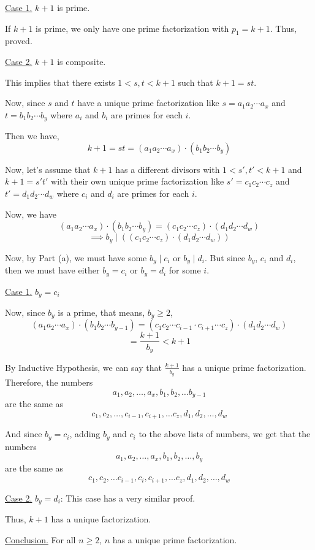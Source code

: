 \begin{enumerate}
	\underline{Case 1.} $k+1$ is prime.

	If $k+1$ is prime, we only have one prime factorization with $p_1 = k+1$. Thus, proved.

	\underline{Case 2.} $k+1$ is composite.

	This implies that there exists $1 < s,t < k+1$ such that $k+1 = st$.

	Now, since $s$ and $t$ have a unique prime factorization like $s = a_1 a_2 \cdots a_x$ and $t = b_1 b_2 \cdots b_y$ where $a_i$ and $b_i$ are primes for each $i$. 

	Then we have,
	$$k+1 = st = (a_1 a_2 \cdots a_x) \cdot (b_1 b_2 \cdots b_y)$$

	Now, let's assume that $k+1$ has a different divisors with $1 < s', t' < k+1$ and $k+1 = s't'$ with their own unique prime factorization like $s' = c_1 c_2 \cdots c_z$ and $t' = d_1 d_2 \cdots d_w$ where $c_i$ and $d_i$ are primes for each $i$.

	Now, we have
	$$(a_1 a_2 \cdots a_x) \cdot (b_1 b_2 \cdots b_y) = (c_1 c_2 \cdots c_z) \cdot (d_1 d_2 \cdots d_w)$$
	$$\implies b_y \mid ((c_1 c_2 \cdots c_z) \cdot (d_1 d_2 \cdots d_w))$$

	Now, by Part (a), we must have some $b_y \mid c_i$ or $b_y \mid d_i$. But since $b_y$, $c_i$ and $d_i$, then we must have either $b_y = c_i$ or $b_y = d_i$ for some $i$.

	\underline{Case 1.} $b_y = c_i$

	Now, since $b_y$ is a prime, that means, $b_y \geq 2$,
	$$(a_1 a_2 \cdots a_x) \cdot (b_1 b_2 \cdots b_{y-1}) = (c_1 c_2 \cdots c_{i-1} \cdot c_{i+1} \cdots c_{z}) \cdot (d_1 d_2 \cdots d_w)$$
	$$= \frac{k+1}{b_y} < k+1$$

	By Inductive Hypothesis, we can say that $\displaystyle \frac{k+1}{b_y}$ has a unique prime factorization. Therefore, the numbers
	$$a_1, a_2, \ldots, a_x, b_1, b_2, \ldots b_{y-1}$$
	are the same as 
	$$c_1, c_2, \ldots, c_{i-1}, c_{i+1}, \ldots c_z, d_1, d_2, \ldots, d_w$$

	And since $b_y = c_i$, adding $b_y$ and $c_i$ to the above lists of numbers, we get that the numbers 
	$$a_1, a_2, \ldots, a_x, b_1, b_2, \ldots, b_y$$
	are the same as 
	$$c_1, c_2, \ldots c_{i-1}, c_i, c_{i+1}, \ldots c_z, d_1, d_2, \ldots, d_w$$

	\underline{Case 2.} $b_y = d_i$: This case has a very similar proof.

	Thus, $k+1$ has a unique factorization.
	
	\underline{Conclusion.} For all $n \geq 2$, $n$ has a unique prime factorization.

	\es
\end{enumerate}
\ep

